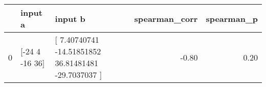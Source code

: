 \begin{tabular}{lllrr}
\toprule
 & input a & input b & spearman\_corr & spearman\_p \\
\midrule
0 & [-24   4 -16  36] & [  7.40740741 -14.51851852  36.81481481 -29.7037037 ] & -0.80 & 0.20 \\
\bottomrule
\end{tabular}
